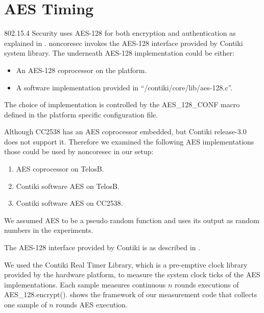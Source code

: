 \section{AES Timing} \label{Sec: AES Timing}

802.15.4 Security uses AES-128 for both encryption and authentication as explained in . noncoresec invokes the AES-128 interface provided by Contiki system library. The underneath AES-128 implementation could be either:
\begin{itemize}
	\item An AES-128 coprocessor on the platform.
	\item A software implementation provided in ``/contiki/core/lib/aes-128.c''.
\end{itemize}

The choice of implementation is controlled by the AES\_128\_CONF macro defined in the platform specific configuration file.

Although CC2538 has an AES coprocessor embedded, but Contiki release-3.0 does not support it. Therefore we examined the following AES implementations those could be used by noncoresec in our setup:

\begin{enumerate}
	\item AES coprocessor on TelosB.
	\item Contiki software AES on TelosB.
	\item Contiki software AES on CC2538.
\end{enumerate}

We assumed AES to be a pseudo random function and uses its output as random numbers in the experiments.

The AES-128 interface provided by Contiki is as described in .

 

We used the Contiki Real Timer Library\cite{RTimer}, which is a pre-emptive clock library provided by the hardware platform, to measure the system clock ticks of the AES implementations. Each sample measures continuous $n$ rounds executions of AES\_128.encrypt().  shows the framework of our measurement code that collects one sample of $n$ rounds AES execution.

 

